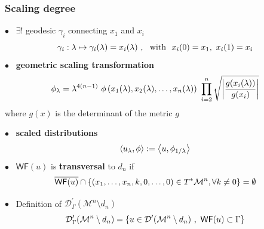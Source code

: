\documentclass[9pt]{beamer}
\newcommand{\sm}[1]{\left\langle #1 \right\rangle}
\newcommand{\abs}[1]{\left|{#1}\right|}
\newcommand{\WF}{\mathsf{WF}}
\newcommand{\Mcal}{\mathcal{M}}
\begin{document}

\begin{frame}[label=details_sd]

\frametitle{Scaling degree}

$\bullet$ \ $\exists !$ geodesic $\gamma_i$ connecting $x_1$ and $x_i$
%
\vspace*{-8pt}
\begin{equation*}
\gamma_i : \lambda \mapsto \gamma_i(\lambda) = x_i(\lambda) \ , \ \mbox{ with } \ x_i(0) =x_1, \ x_i(1) = x_i
\vspace*{-8pt}
\end{equation*}
%
$\bullet$ \ \textbf{geometric scaling transformation} 
%
\vspace*{-8pt}
\begin{equation*}
\phi_\lambda = \lambda^{4(n-1)} \ \phi\left(x_1(\lambda ),x_2(\lambda ),\dots,x_n(\lambda\right)) \ \prod_{i=2}^n \sqrt{\abs{\frac{g(x_i(\lambda ))}{g(x_i)}}}
\vspace*{-8pt}
\end{equation*}
%
where $g(x)$ is the determinant of the metric $g$

\vfill

$\bullet$ \ \textbf{scaled distributions} 
%
\vspace*{-8pt}
\begin{equation*}
\sm{u_\lambda,\phi} := \sm{u,\phi_{1/\lambda}} 
\vspace*{-8pt}
\end{equation*}
% 
$\bullet$ \ $\WF(u)$ is \textbf{transversal} to $d_n$ if 
%
\vspace*{-8pt}
\begin{equation*}
\overline{\WF(u)}\cap \left\{(x_1,\dots, x_n,k,0,\dots,0)\in T^*\Mcal^n, \forall k\neq 0 \right\} = \emptyset 
\vspace*{-8pt}
\end{equation*}

\vfill

$\bullet$ \ Definition of $\mathcal{D}^\prime_\Gamma(\Mcal^n\setminus d_n)$
%
\vspace*{-8pt}
\begin{equation*}
\mathcal{D}^\prime_\Gamma(\Mcal^n\setminus d_n) = \left\{ u \in \mathcal{D}^\prime(\Mcal^n\setminus d_n) \ , \ \WF(u) \subset \Gamma \right\}
\vspace*{-8pt}
\end{equation*}

\vfill

\hfill\hyperlink{sd}{}
 
\end{frame}
\end{document}
